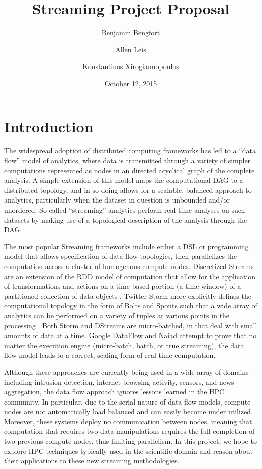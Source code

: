 \documentclass[11pt,letterpaper]{article}
\begin{document}
\title{Streaming Project Proposal}
\author[1]{Benjamin Bengfort}
\author[2]{Allen Leis}
\author[1]{Konstantinos Xirogiannopoulos}

\date{October 12, 2015}

\maketitle
\section*{Introduction}

The widespread adoption of distributed computing frameworks has led to a ``data flow'' model of analytics, where data is transmitted through a variety of simpler computations represented as nodes in an directed acyclical graph of the complete analysis. A simple extension of this model maps the computational DAG to a distributed topology, and in so doing allows for a scalable, balanced approach to analytics, particularly when the dataset in question is unbounded and/or unordered. So called ``streaming'' analytics perform real-time analyses on such datasets by making use of a topological description of the analysis through the DAG.

The most popular Streaming frameworks include either a DSL or programming model that allows specification of data flow topologies, then parallelizes the computation across a cluster of homogenous compute nodes. Discretized Streams are an extension of the RDD model of computation that allow for the application of transformations and actions on a time based portion (a time window) of a partitioned collection of data objects \cite{zaharia2012discretized}. Twitter Storm more explicitly defines the computational topology in the form of Bolts and Spouts such that a wide array of analytics can be performed on a variety of tuples at various points in the processing \cite{toshniwal2014storm}. Both Storm and DStreams are micro-batched, in that deal with small amounts of data at a time. Google DataFlow \cite{akidau2015dataflow} and Naiad \cite{murray2013naiad} attempt to prove that no matter the execution engine (micro-batch, batch, or true streaming), the data flow model leads to a correct, scaling form of real time computation.

Although these approaches are currently being used in a wide array of domains including intrusion detection, internet browsing activity, sensors, and news aggregation, the data flow approach ignores lessons learned in the HPC community. In particular, due to the serial nature of data flow models, compute nodes are not automatically load balanced and can easily become under utilized. Moreover, these systems deploy no communication between nodes, meaning that computation that requires two data manipulations requires the full completion of two previous compute nodes, thus limiting parallelism. In this project, we hope to explore HPC techniques typically used in the scientific domain and reason about their applications to these new streaming methodologies.
\end{document}
